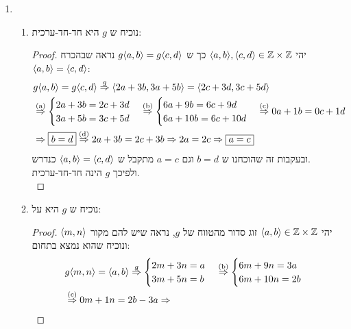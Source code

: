 \documentclass{article}
\begin{document}
\begin{enumerate}
	\pagebreak
	\item
	\begin{enumerate}
		\item נוכיח ש $g$ היא חד-חד-ערכית:
		\begin{proof}
			יהי $\langle a,b \rangle, \langle c,d \rangle \in \mathbb{Z} \times \mathbb{Z}$ כך ש $g\langle a,b \rangle = g\langle c,d \rangle$
			נראה שבהכרח $\langle a,b \rangle = \langle c,d \rangle$:
			\begin{align*}
				&g\langle a,b \rangle = g\langle c,d \rangle \overset{g}\Rightarrow
				\langle 2a + 3b, 3a + 5b \rangle = \langle 2c + 3d, 3c + 5d \rangle \\
				&\overset{\text{(a)}}\Rightarrow
				\begin{cases}
					2a + 3b = 2c + 3d \\
					3a + 5b = 3c + 5d \\
				\end{cases}
				\overset{\text{(b)}}\Rightarrow
				\begin{cases}
					6a + 9b = 6c + 9d \\
					6a + 10b = 6c + 10d \\
				\end{cases}
				\overset{\text{(c)}}\Rightarrow
				0a + 1b = 0c + 1d \\
				&\Rightarrow
				\boxed{b = d}
				\overset{\text{(d)}}\Rightarrow
				2a + 3b = 2c + 3b \Rightarrow
				2a = 2c \Rightarrow
				\boxed{a = c}
			\end{align*}
			ובעקבות זה שהוכחנו ש $b = d$ וגם $a = c$ מתקבל ש $\langle a,b \rangle = \langle c,d \rangle$ כנדרש. \\
			ולפיכך $g$ הינה חד-חד-ערכית. \\
		\end{proof}
		\item נוכיח ש $g$ היא על:
		\begin{proof}
			יהי $\langle a,b \rangle \in \mathbb{Z}\times\mathbb{Z}$ זוג סדור מהטווח של $g$, נראה שיש להם מקור $\langle m,n \rangle$ ונוכיח שהוא נמצא בתחום:
			\begin{align*}
				&g\ang{m,n} = \ang{a,b} \overset{g}\Rightarrow
				\begin{cases}
					2m + 3n = a \\
					3m + 5n = b \\
				\end{cases} \ontop{(b)}\Rightarrow
				\begin{cases}
					6m + 9n = 3a \\
					6m + 10n = 2b \\
				\end{cases} \\
				&\ontop{(c)}\Rightarrow
				0m + 1n = 2b - 3a \Rightarrow

\end{align*}
\end{proof}
\end{enumerate}
\end{enumerate}
\end{document}

